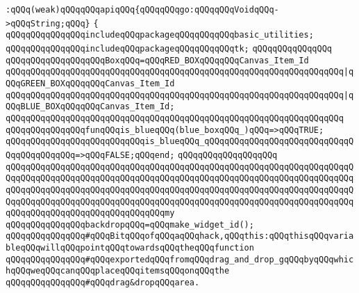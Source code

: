 \newline
\verb|:qQQq(weak)qQQqqQQqapiqQQq{qQQqqQQqgo:qQQqqQQqVoidqQQq->qQQqString;qQQq}|\newline
\newline
\verb|{|\newline
\newline
\verb|qQQqqQQqqQQqqQQqincludeqQQqpackageqQQqqQQqqQQqbasic_utilities;|\newline
\verb|qQQqqQQqqQQqqQQqincludeqQQqpackageqQQqqQQqqQQqtk;|\newline
\newline
\verb|qQQqqQQqqQQqqQQq|\newline
\verb|qQQqqQQqqQQqqQQqqQQqBoxqQQq=qQQqRED_BOXqQQqqQQqCanvas_Item_Id|\newline
\verb|qQQqqQQqqQQqqQQqqQQqqQQqqQQqqQQqqQQqqQQqqQQqqQQqqQQqqQQqqQQqqQQqqQQq|\verb#|qQQqGREEN_BOXqQQqqQQqCanvas_Item_Id#\newline
\verb|qQQqqQQqqQQqqQQqqQQqqQQqqQQqqQQqqQQqqQQqqQQqqQQqqQQqqQQqqQQqqQQqqQQq|\verb#|qQQqBLUE_BOXqQQqqQQqCanvas_Item_Id;#\newline
\verb|qQQqqQQqqQQqqQQqqQQqqQQqqQQqqQQqqQQqqQQqqQQqqQQqqQQqqQQqqQQqqQQqqQQq|\newline
\verb|qQQqqQQqqQQqqQQqfunqQQqis_blueqQQq(blue_boxqQQq_)qQQq=>qQQqTRUE;|\newline
\verb|qQQqqQQqqQQqqQQqqQQqqQQqqQQqis_blueqQQq_qQQqqQQqqQQqqQQqqQQqqQQqqQQqqQQqqQQqqQQqqQQq=>qQQqFALSE;qQQqend;|\newline
\verb|qQQqqQQqqQQqqQQqqQQq|\newline
\verb|qQQqqQQqqQQqqQQqqQQqqQQqqQQqqQQqqQQqqQQqqQQqqQQqqQQqqQQqqQQqqQQqqQQqqQQqqQQqqQQqqQQqqQQqqQQqqQQqqQQqqQQqqQQqqQQqqQQqqQQqqQQqqQQqqQQqqQQqqQQqqQQqqQQqqQQqqQQqqQQqqQQqqQQqqQQqqQQqqQQqqQQqqQQqqQQqqQQqqQQqqQQqqQQqqQQqqQQqqQQqqQQqqQQqqQQqqQQqqQQqqQQqqQQqqQQqqQQqqQQqqQQqqQQqqQQqqQQqqQQqqQQqqQQqqQQqqQQqqQQqqQQqqQQqqQQqmy|\newline
\verb|qQQqqQQqqQQqqQQqbackdropqQQq=qQQqmake_widget_id();|\newline
\newline
\verb|qQQqqQQqqQQqqQQq#qQQqBitqQQqofqQQqaqQQqhack,qQQqthis:qQQqthisqQQqvariableqQQqwillqQQqpointqQQqtowardsqQQqtheqQQqfunction|\newline
\verb|qQQqqQQqqQQqqQQq#qQQqexportedqQQqfromqQQqdrag_and_drop_gqQQqbyqQQqwhichqQQqweqQQqcanqQQqplaceqQQqitemsqQQqonqQQqthe|\newline
\verb|qQQqqQQqqQQqqQQq#qQQqdrag&dropqQQqarea.|\newline
\newline
